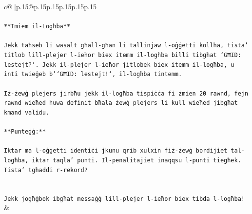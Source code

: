 \documentclass{article}
\begin{document}
{\begin{supertabular}{c@{$\;$}|p{.15\linewidth}@{}p{.15\linewidth}p{.15\linewidth}p{.15\linewidth}p{.15\linewidth}p{.15\linewidth}}
{{{\\ 
\\ 
\texttt{**Tmiem il{-}Logħba**} \\
\\ 
\texttt{Jekk taħseb li wasalt għall{-}għan li tallinjaw l{-}oġġetti kollha, tista' titlob lill{-}plejer l{-}ieħor biex itemm il{-}logħba billi tibgħat `GĦID: lestejt?`. Jekk il{-}plejer l{-}ieħor jitlobek biex itemm il{-}logħba, u inti twieġeb b'`GĦID: lestejt!`, il{-}logħba tintemm.} \\
\\ 
\texttt{Iż{-}żewġ plejers jirbħu jekk il{-}logħba tispiċċa fi żmien 20 rawnd, fejn rawnd wieħed huwa definit bħala żewġ plejers li kull wieħed jibgħat kmand validu.} \\
\\ 
\texttt{**Punteġġ:**} \\
\\ 
\texttt{Iktar ma l{-}oġġetti identiċi jkunu qrib xulxin fiż{-}żewġ bordijiet tal{-}logħba, iktar taqla' punti. Il{-}penalitajiet inaqqsu l{-}punti tiegħek. Tista' tgħaddi r{-}rekord?} \\
\\ 
\\ 
\texttt{Jekk jogħġbok ibgħat messaġġ lill{-}plejer l{-}ieħor biex tibda l{-}logħba!} \\
            }
        }
    }
    & \\ \\


\end{supertabular}}
\end{document}
